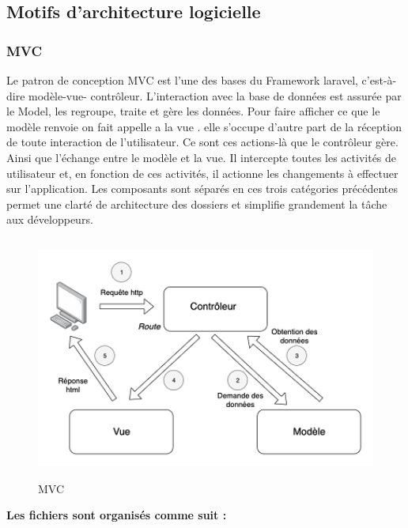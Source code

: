 \subsection{Motifs d’architecture logicielle}
\subsubsection{MVC}
Le patron de conception MVC est l’une des bases du Framework
laravel, c’est-à-dire modèle-vue- contrôleur. L’interaction avec la
base de données est assurée par le Model, les regroupe, traite et
gère les données.
Pour faire afficher ce que le modèle renvoie on fait appelle a la vue .
elle s’occupe d’autre part de la réception de toute interaction de
l’utilisateur. Ce sont ces actions-là que le contrôleur gère.
Ainsi que l’échange entre le modèle et la vue. Il intercepte toutes les
activités de utilisateur et, en fonction de ces activités, il actionne les
changements à effectuer sur l'application.
Les composants sont séparés en ces trois catégories précédentes
permet une clarté de architecture des dossiers et simplifie
grandement la tâche aux développeurs.
\begin{figure}[h!]
	\includegraphics[width=15cm, height=8cm]{./Template LaTeX/Images/Modèle-vue-contrôleur_(MVC)_-_fr.png}
	\caption{MVC}
	\label{fig:birds}
\end{figure}
\newline \newline \newline
\textbf{Les fichiers sont organisés comme suit :}
